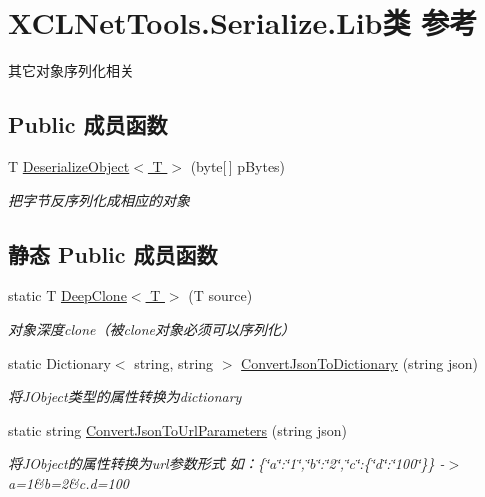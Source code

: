 \hypertarget{class_x_c_l_net_tools_1_1_serialize_1_1_lib}{}\section{X\+C\+L\+Net\+Tools.\+Serialize.\+Lib类 参考}
\label{class_x_c_l_net_tools_1_1_serialize_1_1_lib}


其它对象序列化相关  


\subsection*{Public 成员函数}
\begin{DoxyCompactItemize}
\item 
T \hyperlink{class_x_c_l_net_tools_1_1_serialize_1_1_lib_ae2d400cea76a1f11f5141deab7c6d2b1}{Deserialize\+Object$<$ T $>$} (byte\mbox{[}$\,$\mbox{]} p\+Bytes)
\begin{DoxyCompactList}\small\item\em 把字节反序列化成相应的对象 \end{DoxyCompactList}\end{DoxyCompactItemize}
\subsection*{静态 Public 成员函数}
\begin{DoxyCompactItemize}
\item 
static T \hyperlink{class_x_c_l_net_tools_1_1_serialize_1_1_lib_ad38f60aaa57643027af6ebc86ef7fe18}{Deep\+Clone$<$ T $>$} (T source)
\begin{DoxyCompactList}\small\item\em 对象深度clone（被clone对象必须可以序列化） \end{DoxyCompactList}\item 
static Dictionary$<$ string, string $>$ \hyperlink{class_x_c_l_net_tools_1_1_serialize_1_1_lib_a99dccfb2469a4a61f20742a002a3f0ae}{Convert\+Json\+To\+Dictionary} (string json)
\begin{DoxyCompactList}\small\item\em 将\+J\+Object类型的属性转换为dictionary \end{DoxyCompactList}\item 
static string \hyperlink{class_x_c_l_net_tools_1_1_serialize_1_1_lib_a0034741d0598296a34082889f2a2f83e}{Convert\+Json\+To\+Url\+Parameters} (string json)
\begin{DoxyCompactList}\small\item\em 将\+J\+Object的属性转换为url参数形式 如：\{\char`\"{}a\char`\"{}\+:\char`\"{}1\char`\"{},\char`\"{}b\char`\"{}\+:\char`\"{}2\char`\"{},\char`\"{}c\char`\"{}\+:\{\char`\"{}d\char`\"{}\+:\char`\"{}100\char`\"{}\}\} -\/$>$ a=1\&b=2\&c.\+d=100 \end{DoxyCompactList}\end{DoxyCompactItemize}


